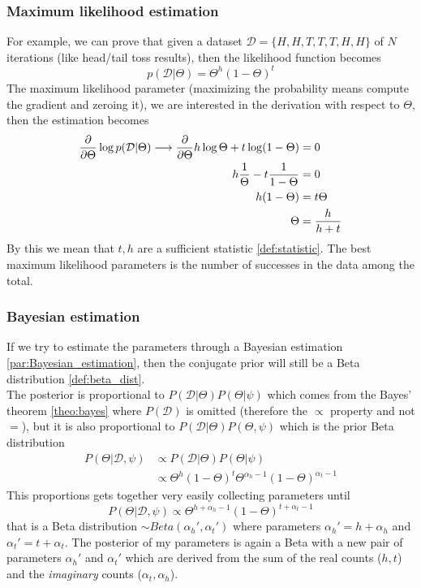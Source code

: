         \subsubsection{Maximum likelihood estimation}
        \label{par:maximum_likelyhood_estim}
            For example, we can prove that given a dataset $\mathcal{D} = \{H, H, T, T, T, H, H\}$ of $N$ iterations (like head/tail toss results), then the likelihood function becomes
            $$p(\mathcal{D}|\Theta) = \Theta^h(1-\Theta)^t$$
            The maximum likelihood parameter (maximizing the probability means compute the gradient and zeroing it), we are interested in the derivation with respect to $\Theta$, then the estimation becomes
            \begin{align*}
                \pdv{}{\Theta} \log p(\mathcal{D}| \Theta) \longrightarrow \pdv{}{\Theta}h\log \Theta + t \log(1-\Theta) &= 0\\
                h\frac{1}{\Theta} - t\frac{1}{1-\Theta} &= 0\\
                h(1-\Theta) &= t\Theta\\
                \Theta &= \frac{h}{h+t}
            \end{align*}
            By this we mean that $t, h$ are a sufficient statistic \ref{def:statistic}. The best maximum likelihood parameters is the number of successes in the data among the total.
        
        \subsubsection{Bayesian estimation}
            If we try to estimate the parameters through a Bayesian estimation \ref{par:Bayesian_estimation}, then the conjugate prior will still be a Beta distribution \ref{def:beta_dist}.\\
            The posterior is proportional to $P(\mathcal{D}|\Theta)P(\Theta|\psi)$ which comes from the Bayes' theorem \ref{theo:bayes} where $P(\mathcal{D})$ is omitted (therefore the $\propto$ property and not $=$), but it is also proportional to $P(\mathcal{D}|\Theta)P(\Theta,\psi)$ which is the prior Beta distribution
            \begin{align*}
                P(\Theta|\mathcal{D}, \psi) &\propto P(\mathcal{D}|\Theta)P(\Theta|\psi)\\
                &\propto \Theta^h (1-\Theta)^t \Theta^{\alpha_h -1} (1-\Theta)^{\alpha_t -1}
            \end{align*}
            This proportions gets together very easily collecting parameters until
            $$P(\Theta|\mathcal{D},\psi) \propto \Theta^{h+\alpha_h -1} (1 - \Theta)^{t + \alpha_t -1}$$
            that is a Beta distribution $\sim Beta(\alpha_h ',\alpha_t ')$ where parameters $\alpha_h '= h+\alpha_h$ and $\alpha_t ' = t + \alpha_t$. 
            The posterior of my parameters is again a Beta with a new pair of parameters $\alpha_h '$ and $\alpha_t '$ which are derived from the sum of the real counts ($h, t$) and the \textit{imaginary} counts ($\alpha_t, \alpha_h$).\\
            
